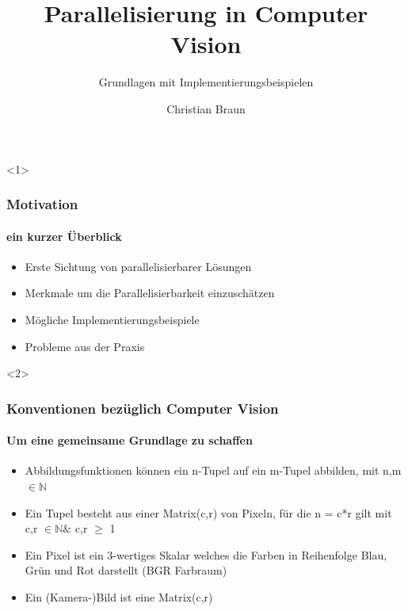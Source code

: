 \documentclass{beamer}
\title{Parallelisierung in Computer Vision}
\subtitle{Grundlagen mit Implementierungsbeispielen}
\author[Braun]{Christian Braun}
\begin{document}
\begin{frame}
  \titlepage
\end{frame}

\begin{frame}<1>
  \frametitle{Motivation}
  \framesubtitle{ein kurzer Überblick}
  
  \begin{itemize}
    \item Erste Sichtung von parallelisierbarer Lösungen
    \item Merkmale um die Parallelisierbarkeit einzuschätzen
    \item Mögliche Implementierungsbeispiele
    \item Probleme aus der Praxis
  \end{itemize}
  
\end{frame}

\begin{frame}<2>
  \frametitle{Konventionen bezüglich Computer Vision}
  \framesubtitle{Um eine gemeinsame Grundlage zu schaffen}
  \begin{itemize}
    \item Abbildungsfunktionen können ein n-Tupel auf ein m-Tupel abbilden, mit n,m $\in \mathbb{N}$
    \item Ein Tupel besteht aus einer Matrix(c,r) von Pixeln, für die n = c*r gilt mit c,r $\in \mathbb{N} \&$ c,r $\geq$ 1
    \item Ein Pixel ist ein 3-wertiges Skalar welches die Farben in Reihenfolge Blau, Grün und Rot darstellt (BGR Farbraum)
    \item Ein (Kamera-)Bild ist eine Matrix(c,r) 
  \end{itemize}
\end{frame}
\end{document}
